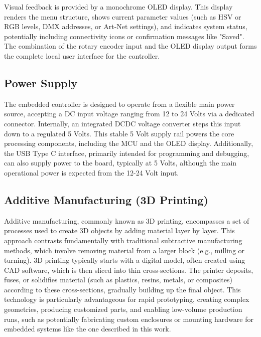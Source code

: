 Visual feedback is provided by a monochrome \ac{OLED} display. This display renders the menu structure, shows current parameter values (such as \ac{HSV} or \ac{RGB} levels, \ac{DMX} addresses, or Art-Net settings), and indicates system status, potentially including connectivity icons or confirmation messages like "Saved". The combination of the rotary encoder input and the \ac{OLED} display output forms the complete local user interface for the controller.

\subsection{Power Supply}
The embedded controller is designed to operate from a flexible main power source, accepting a \ac{DC} input voltage ranging from 12 to 24 Volts via a dedicated connector. Internally, an integrated \ac{DCDC} voltage converter steps this input down to a regulated 5 Volts. This stable 5 Volt supply rail powers the core processing components, including the \ac{MCU} and the \ac{OLED} display. Additionally, the \ac{USB} Type C interface, primarily intended for programming and debugging, can also supply power to the board, typically at 5 Volts, although the main operational power is expected from the 12-24 Volt input.

\subsection{Additive Manufacturing (3D Printing)}\label{subsec:theoretical_3d_printing}
Additive manufacturing, commonly known as \ac{3D} printing, encompasses a set of processes used to create \ac{3D} objects by adding material layer by layer. This approach contrasts fundamentally with traditional subtractive manufacturing methods, which involve removing material from a larger block (e.g., milling or turning). \ac{3D} printing typically starts with a digital model, often created using \ac{CAD} software, which is then sliced into thin cross-sections. The printer deposits, fuses, or solidifies material (such as plastics, resins, metals, or composites) according to these cross-sections, gradually building up the final object. This technology is particularly advantageous for rapid prototyping, creating complex geometries, producing customized parts, and enabling low-volume production runs, such as potentially fabricating custom enclosures or mounting hardware for embedded systems like the one described in this work.

